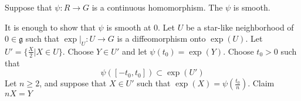 \documentclass[11pt,a4paper]{scrarticle}
\theoremstyle{definition}
\renewenvironment{proof}[1][\proofname]{\vspace{-15pt}\begin{myproof}}{\end{myproof}}
\theoremstyle{greenbox}
\newcommand{\fg}{\mathfrak{g}}
\begin{document}
\begin{thm}
    Suppose that $ \psi : R \to G $ is a continuous homomorphism. The $ \psi $ is smooth.
\end{thm}
\begin{proof}
    It is enough to show that $ \psi $ is smooth at $ 0 $. Let $ U $ be a star-like neighborhood of $ 0 \in \fg $ such that $ \exp|_{U}  :U \to G $ is a diffeomorphism onto $ \exp(U) $. Let $ U' = \{\frac{X}{2} | X \in U\} $. Choose $ Y \in U' $ and let $ \psi(t_{0}) = \exp(Y) $. Choose $ t_{0} > 0  $ such that 
    \[ \psi([-t_{0},t_{0}]) \subset \exp(U') \]
    Let $ n \ge 2 $, and suppose that $ X \in U'
     $ such that $ \exp(X) = \psi(  \frac{t_{0}}{n}) $. Claim $ nX = Y $
\end{proof}
\end{document}
